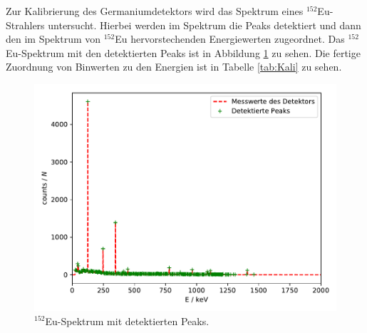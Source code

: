 Zur Kalibrierung des Germaniumdetektors wird das Spektrum eines $^{152}$Eu-Strahlers untersucht. Hierbei werden im Spektrum die Peaks detektiert und dann den im Spektrum von $^{152}$Eu hervorstechenden Energiewerten zugeordnet. Das $^{152}$Eu-Spektrum mit den detektierten Peaks ist in Abbildung \ref{abb:Europiumspektrum} zu sehen. Die fertige Zuordnung von Binwerten zu den Energien ist in Tabelle \ref{tab:Kali} zu sehen.
\FloatBarrier
\begin{figure}
    \centering
    \includegraphics[scale=0.7]{Detektormesswerte.pdf}
    \caption{$^{152}$Eu-Spektrum mit detektierten Peaks.}
    \label{abb:Europiumspektrum}
\end{figure}
\FloatBarrier

